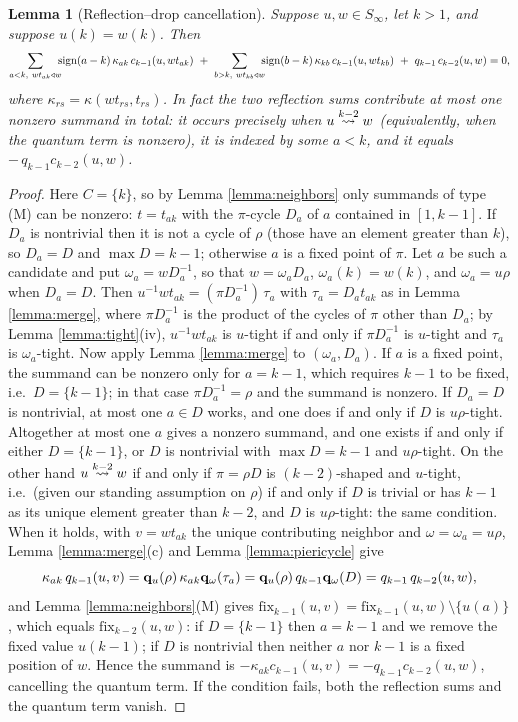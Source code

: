 \documentclass{amsart}
\newtheorem{lemma}{Lemma}[section]
\theoremstyle{definition}
\theoremstyle{remark}
\numberwithin{equation}{section}
\newcommand{\xrightsquigarrow}[2][]{%
	\mathrel{\mathop{\rightsquigarrow}\limits^{\scriptstyle #2}%
	\ifx\hfuzz#1\hfuzz\else_{\scriptstyle #1}\fi}%
}
\newcommand{\tom}[1]{\ensuremath{\xrightsquigarrow{#1}}}
\newcommand{\fx}{\mathrm{fix}}
\begin{document}
\begin{lemma}[Reflection--drop cancellation] \label{lemma:reflectioncancel}
Suppose $u,w\in S_\infty$, let $k>1$, and suppose $u(k)=w(k)$. Then
$$\sum_{\substack{a<k,\ wt_{ak}\triangleleft w}}\!\!\!\mathrm{sign}(a-k)\,\kappa_{ak}\,c_{k-1}(u,wt_{ak})\ +\ \sum_{\substack{b>k,\ wt_{kb}\triangleleft w}}\!\!\!\mathrm{sign}(b-k)\,\kappa_{kb}\,c_{k-1}(u,wt_{kb})\ +\ q_{k-1}\,c_{k-2}(u,w)=0,$$
where $\kappa_{rs}=\kappa(wt_{rs},t_{rs})$. In fact the two reflection sums contribute at most one nonzero summand in total: it occurs precisely when $u\tom{k-2}w$ (equivalently, when the quantum term is nonzero), it is indexed by some $a<k$, and it equals $-\,q_{k-1}c_{k-2}(u,w)$.
\end{lemma}
\begin{proof}
Here $C=\{k\}$, so by Lemma \ref{lemma:neighbors} only summands of type (M) can be nonzero: $t=t_{ak}$ with the $\pi$-cycle $D_a$ of $a$ contained in $[1,k-1]$. If $D_a$ is nontrivial then it is not a cycle of $\rho$ (those have an element greater than $k$), so $D_a=D$ and $\max D=k-1$; otherwise $a$ is a fixed point of $\pi$. Let $a$ be such a candidate and put $\omega_a=wD_a^{-1}$, so that $w=\omega_aD_a$, $\omega_a(k)=w(k)$, and $\omega_a=u\rho$ when $D_a=D$. Then $u^{-1}wt_{ak}=(\pi D_a^{-1})\,\tau_a$ with $\tau_a=D_at_{ak}$ as in Lemma \ref{lemma:merge}, where $\pi D_a^{-1}$ is the product of the cycles of $\pi$ other than $D_a$; by Lemma \ref{lemma:tight}(iv), $u^{-1}wt_{ak}$ is $u$-tight if and only if $\pi D_a^{-1}$ is $u$-tight and $\tau_a$ is $\omega_a$-tight. Now apply Lemma \ref{lemma:merge} to $(\omega_a,D_a)$. If $a$ is a fixed point, the summand can be nonzero only for $a=k-1$, which requires $k-1$ to be fixed, i.e.\ $D=\{k-1\}$; in that case $\pi D_a^{-1}=\rho$ and the summand is nonzero. If $D_a=D$ is nontrivial, at most one $a\in D$ works, and one does if and only if $D$ is $u\rho$-tight. Altogether at most one $a$ gives a nonzero summand, and one exists if and only if either $D=\{k-1\}$, or $D$ is nontrivial with $\max D=k-1$ and $u\rho$-tight. On the other hand $u\tom{k-2}w$ if and only if $\pi=\rho D$ is $(k-2)$-shaped and $u$-tight, i.e.\ (given our standing assumption on $\rho$) if and only if $D$ is trivial or has $k-1$ as its unique element greater than $k-2$, and $D$ is $u\rho$-tight: the same condition. When it holds, with $v=wt_{ak}$ the unique contributing neighbor and $\omega=\omega_a=u\rho$, Lemma \ref{lemma:merge}(c) and Lemma \ref{lemma:piericycle} give
$$\kappa_{ak}\,q_{k-1}(u,v)=\mathbf{q}_u(\rho)\,\kappa_{ak}\mathbf{q}_\omega(\tau_a)=\mathbf{q}_u(\rho)\,q_{k-1}\mathbf{q}_\omega(D)=q_{k-1}\,q_{k-2}(u,w),$$
and Lemma \ref{lemma:neighbors}(M) gives $\fx_{k-1}(u,v)=\fx_{k-1}(u,w)\setminus\{u(a)\}$, which equals $\fx_{k-2}(u,w)$: if $D=\{k-1\}$ then $a=k-1$ and we remove the fixed value $u(k-1)$; if $D$ is nontrivial then neither $a$ nor $k-1$ is a fixed position of $w$. Hence the summand is $-\kappa_{ak}c_{k-1}(u,v)=-q_{k-1}c_{k-2}(u,w)$, cancelling the quantum term. If the condition fails, both the reflection sums and the quantum term vanish.
\end{proof}
\end{document}
